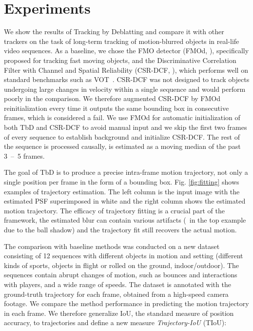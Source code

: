 \documentclass[10pt,twocolumn,letterpaper]{article}
\begin{document}
\section{Experiments}
\label{sec:experiments}
We show the results of Tracking by Deblatting and compare it with other trackers on the task of long-term tracking of motion-blurred objects in real-life video sequences. As a baseline, we chose the FMO detector (FMOd, \cite{fmo}), specifically proposed for tracking fast moving objects, and the Discriminative Correlation Filter with Channel and Spatial Reliability (CSR-DCF, \cite{csrdcf}), which performs well on standard benchmarks such as VOT~\cite{vot2016}. CSR-DCF was not designed to track objects undergoing large changes in velocity within a single sequence and would perform poorly in the comparison. We therefore augmented CSR-DCF by FMOd reinitialization every time it outputs the same bounding box in consecutive frames, which is considered a fail. We use FMOd for automatic initialization of both TbD and CSR-DCF to avoid manual input and we skip the first two frames of every sequence to establish background  and initialize CSR-DCF. The rest of the sequence is processed causally,  is estimated as a moving median of the  past 3~--~5 frames.

The goal of TbD is to produce a precise intra-frame motion trajectory, not only a single position per frame in the form of a bounding box. Fig. \ref{fig:fitting} shows examples of trajectory estimation.
The left column is the input image with the estimated PSF superimposed in white and the right column shows the estimated motion trajectory. The efficacy of trajectory fitting is a crucial part of the framework, the estimated blur can contain various artifacts (\eg~in the top example due to the ball shadow) and the trajectory fit still recovers the actual motion.

The comparison with baseline methods was conducted on a new dataset consisting of 12 sequences with different objects in motion and setting (different kinds of sports, objects in flight or rolled on the ground, indoor/outdoor). The sequences contain abrupt changes of motion, such as bounces and interactions with players, and a wide range of speeds.
The dataset is annotated with the ground-truth trajectory for each frame, obtained from  a high-speed camera footage.
We compare the method performance in predicting the motion trajectory in each frame. We therefore generalize IoU, the standard measure of position accuracy, to trajectories and define a new measure \emph{Trajectory-IoU} (TIoU):
\end{document}
